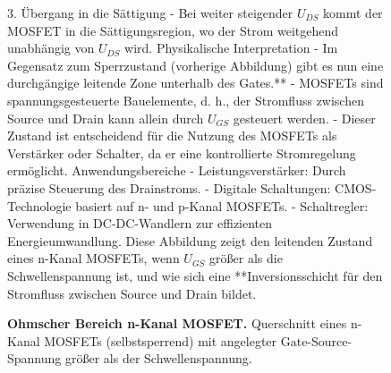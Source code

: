 {\begin{figure}[H]
{    3. Übergang in die Sättigung
    - Bei weiter steigender \( U_{DS} \) kommt der MOSFET in die Sättigungsregion, wo der Strom weitgehend unabhängig von \( U_{DS} \) wird.  
    Physikalische Interpretation
    - Im Gegensatz zum Sperrzustand (vorherige Abbildung) gibt es nun eine durchgängige leitende Zone unterhalb des Gates.**  
    - MOSFETs sind spannungsgesteuerte Bauelemente, d. h., der Stromfluss zwischen Source und Drain kann allein durch \( U_{GS} \) gesteuert werden.  
    - Dieser Zustand ist entscheidend für die Nutzung des MOSFETs als Verstärker oder Schalter, da er eine kontrollierte Stromregelung ermöglicht.  
    Anwendungsbereiche
    - Leistungsverstärker: Durch präzise Steuerung des Drainstroms.  
    - Digitale Schaltungen: CMOS-Technologie basiert auf n- und p-Kanal MOSFETs.  
    - Schaltregler: Verwendung in DC-DC-Wandlern zur effizienten Energieumwandlung.  
    Diese Abbildung zeigt den leitenden Zustand eines n-Kanal MOSFETs, wenn \( U_{GS} \) größer als die Schwellenspannung ist, und wie sich eine **Inversionsschicht für den Stromfluss zwischen Source und Drain bildet.}
    \caption{\textbf{Ohmscher Bereich n-Kanal MOSFET.} Querschnitt eines n-Kanal MOSFETs (selbstsperrend) mit 
    angelegter Gate-Source-Spannung größer als der Schwellenspannung.}  
    \label{fig:OhmscherBereichN-KanalMOSFET}
\end{figure}}




